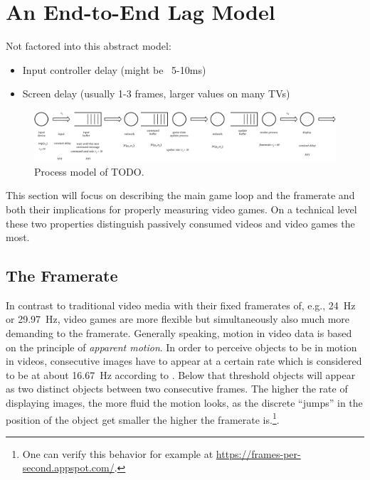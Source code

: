 \section{An End-to-End Lag Model}
\label{sec:model}


Not factored into this abstract model:

\begin{itemize}
	\item Input controller delay (might be ~5-10ms)
	\item Screen delay (usually 1-3 frames, larger values on many TVs)
\end{itemize}

\begin{figure}[!t]
	\centering
	\includegraphics[width=1.0\columnwidth]{../models/e2e-lag-model.pdf}
	\caption{Process model of TODO.}
\label{fig:queuing-model}
\end{figure}



This section will focus on describing the main game loop and the framerate and both their implications for properly measuring video games. On a technical level these two properties distinguish passively consumed videos and video games the most.


\subsection{The Framerate}
\label{sec:framerate}

In contrast to traditional video media with their fixed framerates of, e.g., \SI{24}{\hertz} or \SI{29.97}{\hertz}, video games are more flexible but simultaneously also much more demanding to the framerate. Generally speaking, motion in video data is based on the principle of \textit{apparent motion}. In order to perceive objects to be in motion in videos, consecutive images have to appear at a certain rate which is considered to be at about \SI{16.67}{\hertz} according to \cite{wertheimer1912experimentelle}. Below that threshold objects will appear as two distinct objects between two consecutive frames. %
The higher the rate of displaying images, the more fluid the motion looks, as the discrete ``jumps'' in the position of the object get smaller the higher the framerate is.\footnote{One can verify this behavior for example at \url{https://frames-per-second.appspot.com/}.}.

